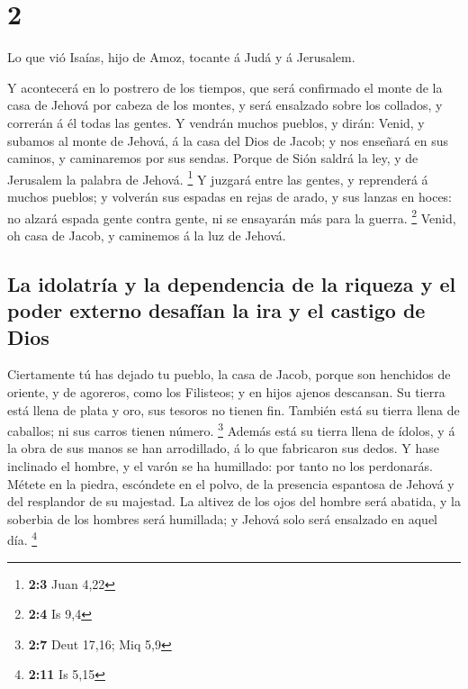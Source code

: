 \hypertarget{section-1}{%
\section{2}\label{section-1}}

 Lo que vió Isaías, hijo de Amoz, tocante á Judá y á
Jerusalem.

 Y acontecerá en lo postrero de los tiempos, que será
confirmado el monte de la casa de Jehová por cabeza de los montes, y
será ensalzado sobre los collados, y correrán á él todas las gentes.
 Y vendrán muchos pueblos, y dirán: Venid, y subamos al
monte de Jehová, á la casa del Dios de Jacob; y nos enseñará en sus
caminos, y caminaremos por sus sendas. Porque de Sión saldrá la ley, y
de Jerusalem la palabra de Jehová. \footnote{\textbf{2:3} Juan 4,22}
 Y juzgará entre las gentes, y reprenderá á muchos pueblos;
y volverán sus espadas en rejas de arado, y sus lanzas en hoces: no
alzará espada gente contra gente, ni se ensayarán más para la guerra.
\footnote{\textbf{2:4} Is 9,4}  Venid, oh casa de Jacob, y
caminemos á la luz de Jehová.

\hypertarget{la-idolatruxeda-y-la-dependencia-de-la-riqueza-y-el-poder-externo-desafuxedan-la-ira-y-el-castigo-de-dios}{%
\subsection{La idolatría y la dependencia de la riqueza y el poder
externo desafían la ira y el castigo de
Dios}\label{la-idolatruxeda-y-la-dependencia-de-la-riqueza-y-el-poder-externo-desafuxedan-la-ira-y-el-castigo-de-dios}}

 Ciertamente tú has dejado tu pueblo, la casa de Jacob,
porque son henchidos de oriente, y de agoreros, como los Filisteos; y en
hijos ajenos descansan.  Su tierra está llena de plata y
oro, sus tesoros no tienen fin. También está su tierra llena de
caballos; ni sus carros tienen número. \footnote{\textbf{2:7} Deut
  17,16; Miq 5,9}  Además está su tierra llena de ídolos, y
á la obra de sus manos se han arrodillado, á lo que fabricaron sus
dedos.  Y hase inclinado el hombre, y el varón se ha
humillado: por tanto no los perdonarás.  Métete en la
piedra, escóndete en el polvo, de la presencia espantosa de Jehová y del
resplandor de su majestad.  La altivez de los ojos del
hombre será abatida, y la soberbia de los hombres será humillada; y
Jehová solo será ensalzado en aquel día. \footnote{\textbf{2:11} Is 5,15}

